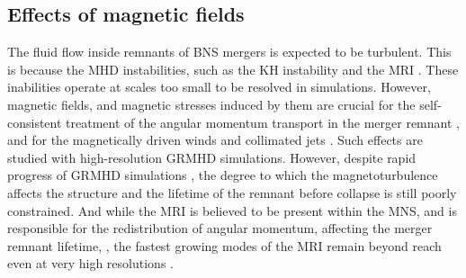 
\subsection{Effects of magnetic fields}


The fluid flow inside remnants of \ac{BNS} mergers is expected to be turbulent. 
This is because the \ac{MHD} instabilities,
such as the \ac{KH} instability and the \ac{MRI} \citep{Balbus:1991}.
These inabilities operate at scales too small to be resolved in simulations.
However, magnetic fields, and magnetic stresses induced by them are crucial for 
the self-consistent treatment of the angular momentum transport in the merger remnant \citep{Duez:2006qe,Kiuchi:2014hja,Guilet:2016sqd,Kiuchi:2017zzg}, and for the 
magnetically driven winds and collimated jets 
\citep{Rezzolla:2011da,Bucciantini:2011kx,Siegel:2014ita,Ruiz:2016rai,Metzger:2018uni}.
%
Such effects are studied with high-resolution \ac{GRMHD} simulations. 
However, despite rapid progress of \ac{GRMHD} simulations 
\citep[\eg][]{Rezzolla:2011da,Kiuchi:2014hja,Ruiz:2016rai},
the degree to which the magnetoturbulence affects the structure and the 
lifetime of the remnant before collapse is still poorly constrained.
%
And while the \ac{MRI} is believed to be present within the 
\ac{MNS}, and is responsible for the redistribution of angular momentum, affecting the 
merger remnant lifetime, \citep[\eg][]{Duez:2006qe,Siegel:2013nrw}, 
the fastest growing modes of the \ac{MRI} remain beyond 
reach even at very high resolutions \citep[\eg][]{Kiuchi:2014hja}.
%
